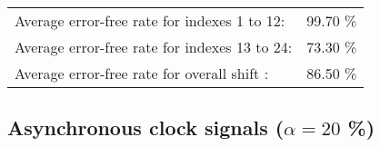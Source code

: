 \begin{table}[h]
\begin{center}
\begin{tabular}{|c|c|c|c|c|}
\end{tabular}


\flushleft
\begin{tabular}{l l}
Average error-free rate for indexes  1 to 12: & 99.70 \% \\
Average error-free rate for indexes 13 to 24: & 73.30 \% \\
Average error-free rate for overall shift   : & 86.50 \% \\

\end{tabular}


\end{center}
\end{table}

\pagebreak
\subsection{Asynchronous clock signals ($\alpha=20$ \%)}

